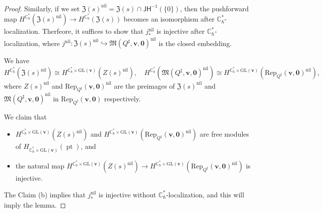 \documentclass[10pt]{amsart}
\theoremstyle{definition}
\numberwithin{equation}{section}
\newcommand{\GL}{\mathrm{GL}}
\newcommand{\bC}{\mathbb{C}}
\newcommand{\bv}{\mathbf{v}}
\newcommand{\fM}{\mathfrak{M}}
\newcommand{\pt}{\operatorname{pt}}
\begin{document}
\begin{proof}
Similarly, if we set $\mathfrak{Z}(s)^{\mathrm{nil}}=\mathfrak{Z}(s)\cap \mathsf{JH}^{-1}(\{0\})$, then the pushforward map $H^{\bC^*_\hbar}(\mathfrak{Z}(s)^{\mathrm{nil}})\to H^{\bC^*_\hbar}(\mathfrak{Z}(s))$ becomes an isomorphism after $\bC^*_\hbar$-localization. Therfeore, it suffices to show that $j^{\mathrm{nil}}_*$ is injective after $\bC^*_\hbar$-localization, where $j^{\mathrm{nil}}\colon \mathfrak{Z}(s)^{\mathrm{nil}}\hookrightarrow \fM(Q^\sharp,\bv,\mathbf 0)^{\mathrm{nil}}$ is the closed embedding.

We have 
$$H^{\bC^*_\hbar}(\mathfrak{Z}(s)^{\mathrm{nil}})\cong H^{\bC^*_\hbar\times \GL(\bv)}(Z(s)^{\mathrm{nil}}), \quad 
H^{\bC^*_\hbar}(\fM(Q^\sharp,\bv,\mathbf 0)^{\mathrm{nil}})\cong H^{\bC^*_\hbar\times \GL(\bv)}(\mathrm{Rep}_{Q^\sharp}(\bv,\mathbf 0)^{\mathrm{nil}}), $$ where $Z(s)^{\mathrm{nil}}$ and $\mathrm{Rep}_{Q^\sharp}(\bv,\mathbf 0)^{\mathrm{nil}}$ are the preimages of $\mathfrak{Z}(s)^{\mathrm{nil}}$ and $\fM(Q^\sharp,\bv,\mathbf 0)^{\mathrm{nil}}$ in $\mathrm{Rep}_{Q^\sharp}(\bv,\mathbf 0)$ respectively. 

We claim that
\begin{itemize}
    \item[(a)] $H^{\bC^*_\hbar\times \GL(\bv)}(Z(s)^{\mathrm{nil}})$ and $ H^{\bC^*_\hbar\times \GL(\bv)}(\mathrm{Rep}_{Q^\sharp}(\bv,\mathbf 0)^{\mathrm{nil}})$ are free modules of $H_{\bC^*_\hbar\times \GL(\bv)}(\pt)$, and
    \item[(b)] the natural map $H^{\bC^*_\hbar\times \GL(\bv)}(Z(s)^{\mathrm{nil}})\to H^{\bC^*_\hbar\times \GL(\bv)}(\mathrm{Rep}_{Q^\sharp}(\bv,\mathbf 0)^{\mathrm{nil}})$ is injective.
\end{itemize}
The Claim (b) implies that $j^{\mathrm{nil}}_*$ is injective without $\bC^*_\hbar$-localization, and this will imply the lemma.


\end{proof}
\end{document}
